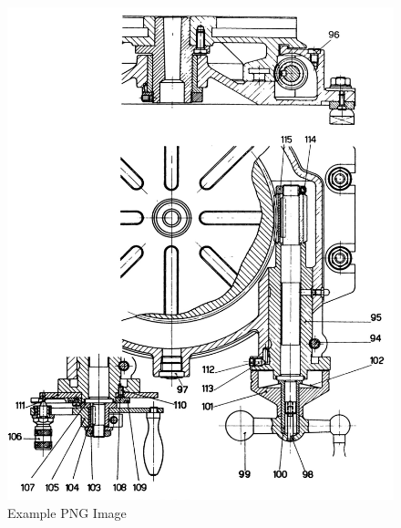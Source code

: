 \newpage
\begin{figure}[h]
    \centering
    \includegraphics[width=1.0\linewidth]{images/page_33}
    \caption{Example PNG Image}
    \label{fig:rotary_table}
\end{figure}
